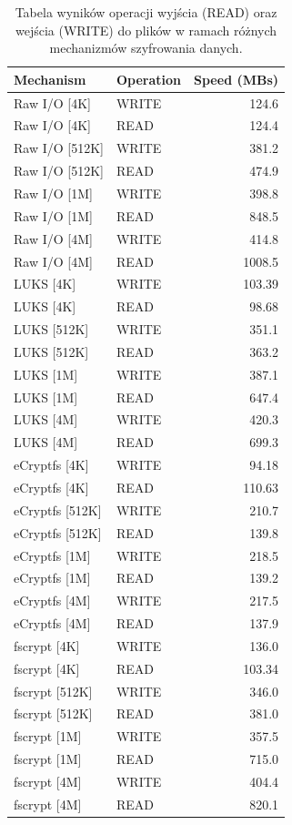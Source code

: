 \documentclass[a4paper]{article}
\begin{document}
\begin{table}[H]
    \centering
    \begin{tabular}{|l|l|r|}
        \hline
        Mechanism & Operation & Speed (MBs) \\
        \hline
        Raw I/O [4K] & WRITE & 124.6 \\
        Raw I/O [4K] & READ & 124.4 \\
        Raw I/O [512K] & WRITE & 381.2 \\
        Raw I/O [512K] & READ & 474.9 \\
        Raw I/O [1M] & WRITE & 398.8 \\
        Raw I/O [1M] & READ & 848.5 \\
        Raw I/O [4M] & WRITE & 414.8 \\
        Raw I/O [4M] & READ & 1008.5 \\
        LUKS [4K] & WRITE & 103.39 \\
        LUKS [4K] & READ & 98.68 \\
        LUKS [512K] & WRITE & 351.1 \\
        LUKS [512K] & READ & 363.2 \\
        LUKS [1M] & WRITE & 387.1 \\
        LUKS [1M] & READ & 647.4 \\
        LUKS [4M] & WRITE & 420.3 \\
        LUKS [4M] & READ & 699.3 \\
        eCryptfs [4K] & WRITE & 94.18 \\
        eCryptfs [4K] & READ & 110.63 \\
        eCryptfs [512K] & WRITE & 210.7 \\
        eCryptfs [512K] & READ & 139.8 \\
        eCryptfs [1M] & WRITE & 218.5 \\
        eCryptfs [1M] & READ & 139.2 \\
        eCryptfs [4M] & WRITE & 217.5 \\
        eCryptfs [4M] & READ & 137.9 \\
        fscrypt [4K] & WRITE & 136.0 \\
        fscrypt [4K] & READ & 103.34 \\
        fscrypt [512K] & WRITE & 346.0 \\
        fscrypt [512K] & READ & 381.0 \\
        fscrypt [1M] & WRITE & 357.5 \\
        fscrypt [1M] & READ & 715.0 \\
        fscrypt [4M] & WRITE & 404.4 \\
        fscrypt [4M] & READ & 820.1 \\
        \hline
    \end{tabular}
    \caption{Tabela wyników operacji wyjścia (READ) oraz wejścia (WRITE) do plików w ramach
    różnych mechanizmów szyfrowania danych.}
    \label{tab:dd_results}
\end{table}
\end{document}
